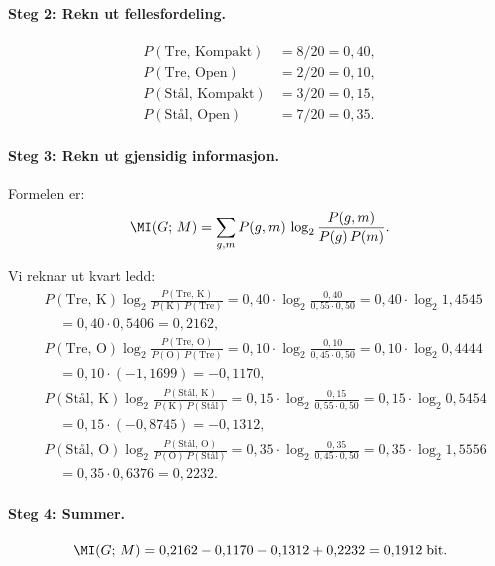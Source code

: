 \paragraph{Steg 2: Rekn ut fellesfordeling.}
\begin{align*}
  P(\text{Tre, Kompakt}) &= 8/20 = 0{,}40, \\
  P(\text{Tre, Open}) &= 2/20 = 0{,}10, \\
  P(\text{Stål, Kompakt}) &= 3/20 = 0{,}15, \\
  P(\text{Stål, Open}) &= 7/20 = 0{,}35.
\end{align*}

\paragraph{Steg 3: Rekn ut gjensidig informasjon.}
Formelen er:
\[
  \MI(G;\, M) = \sum_{g, m} P(g, m) \,
  \log_2 \frac{P(g, m)}{P(g) \, P(m)}.
\]

Vi reknar ut kvart ledd:
\begin{align*}
  &P(\text{Tre, K}) \log_2
    \frac{P(\text{Tre, K})}{P(\text{K})\,P(\text{Tre})}
  = 0{,}40 \cdot \log_2 \frac{0{,}40}{0{,}55 \cdot 0{,}50}
  = 0{,}40 \cdot \log_2 1{,}4545 \\
  &\quad= 0{,}40 \cdot 0{,}5406 = 0{,}2162, \\[4pt]
  &P(\text{Tre, O}) \log_2
    \frac{P(\text{Tre, O})}{P(\text{O})\,P(\text{Tre})}
  = 0{,}10 \cdot \log_2 \frac{0{,}10}{0{,}45 \cdot 0{,}50}
  = 0{,}10 \cdot \log_2 0{,}4444 \\
  &\quad= 0{,}10 \cdot (-1{,}1699) = -0{,}1170, \\[4pt]
  &P(\text{Stål, K}) \log_2
    \frac{P(\text{Stål, K})}{P(\text{K})\,P(\text{Stål})}
  = 0{,}15 \cdot \log_2 \frac{0{,}15}{0{,}55 \cdot 0{,}50}
  = 0{,}15 \cdot \log_2 0{,}5454 \\
  &\quad= 0{,}15 \cdot (-0{,}8745) = -0{,}1312, \\[4pt]
  &P(\text{Stål, O}) \log_2
    \frac{P(\text{Stål, O})}{P(\text{O})\,P(\text{Stål})}
  = 0{,}35 \cdot \log_2 \frac{0{,}35}{0{,}45 \cdot 0{,}50}
  = 0{,}35 \cdot \log_2 1{,}5556 \\
  &\quad= 0{,}35 \cdot 0{,}6376 = 0{,}2232.
\end{align*}

\paragraph{Steg 4: Summer.}
\[
  \MI(G;\, M) = 0{,}2162 - 0{,}1170 - 0{,}1312 + 0{,}2232
  = 0{,}1912 \;\text{bit}.
\]


